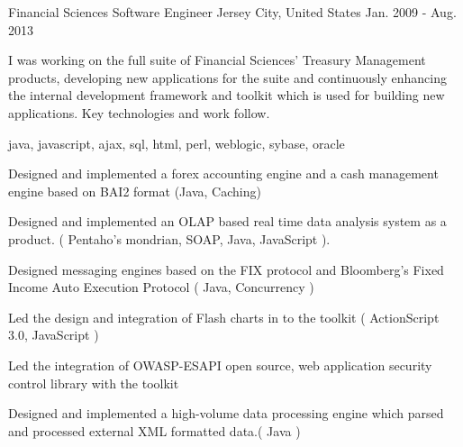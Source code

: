 \cventry
    {Financial Sciences} %
    {Software Engineer} %
    {Jersey City, United States} %
    {Jan. 2009 - Aug. 2013} %
    {
    \begin{cvitems} %
        I was working on the full suite of Financial Sciences' Treasury Management products, developing new applications for the suite and continuously enhancing the
        internal development framework and toolkit which is used for building new applications. Key technologies and work follow.
        \item { java, javascript, ajax, sql, html, perl, weblogic, sybase, oracle }
        \item { Designed and implemented a forex accounting engine and a cash management engine based on BAI2 format (Java, Caching)}
        \item { Designed and implemented an OLAP based real time data analysis system as a product. ( Pentaho's mondrian, SOAP, Java, JavaScript ).}
        \item { Designed messaging engines based on the FIX protocol and Bloomberg's Fixed Income Auto Execution Protocol ( Java, Concurrency )}
        \item { Led the design and integration of Flash charts in to the toolkit ( ActionScript 3.0, JavaScript )}
        \item { Led the integration of OWASP-ESAPI open source, web application security control library with the toolkit}
        \item { Designed and implemented a high-volume data processing engine which parsed and processed external XML formatted data.( Java )}
    \end{cvitems}
    }